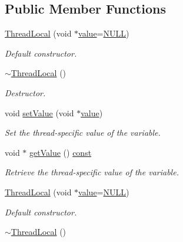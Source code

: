 \subsection*{Public Member Functions}
\begin{DoxyCompactItemize}
\item 
\hyperlink{classsf_1_1_thread_local_a44ea3c4be4eef118080275cbf4cf04cd}{Thread\-Local} (void $\ast$\hyperlink{curses_8priv_8h_a3772851912abe3ccbff5c659ff71f2ff}{value}=\hyperlink{internal_8h_a070d2ce7b6bb7e5c05602aa8c308d0c4}{N\-U\-L\-L})
\begin{DoxyCompactList}\small\item\em Default constructor. \end{DoxyCompactList}\item 
\hyperlink{classsf_1_1_thread_local_acc612bddfd0f0507b1c5da8b3b8c75c2}{$\sim$\-Thread\-Local} ()
\begin{DoxyCompactList}\small\item\em Destructor. \end{DoxyCompactList}\item 
void \hyperlink{classsf_1_1_thread_local_ab7e334c83d77644a8e67ee31c3230007}{set\-Value} (void $\ast$\hyperlink{curses_8priv_8h_a3772851912abe3ccbff5c659ff71f2ff}{value})
\begin{DoxyCompactList}\small\item\em Set the thread-\/specific value of the variable. \end{DoxyCompactList}\item 
void $\ast$ \hyperlink{classsf_1_1_thread_local_aef35a39686eac4b6634a6e5605aacfd7}{get\-Value} () \hyperlink{term__entry_8h_a57bd63ce7f9a353488880e3de6692d5a}{const} 
\begin{DoxyCompactList}\small\item\em Retrieve the thread-\/specific value of the variable. \end{DoxyCompactList}\item 
\hyperlink{classsf_1_1_thread_local_a44ea3c4be4eef118080275cbf4cf04cd}{Thread\-Local} (void $\ast$\hyperlink{curses_8priv_8h_a3772851912abe3ccbff5c659ff71f2ff}{value}=\hyperlink{internal_8h_a070d2ce7b6bb7e5c05602aa8c308d0c4}{N\-U\-L\-L})
\begin{DoxyCompactList}\small\item\em Default constructor. \end{DoxyCompactList}\item 
\hyperlink{classsf_1_1_thread_local_acc612bddfd0f0507b1c5da8b3b8c75c2}{$\sim$\-Thread\-Local} ()

\end{DoxyCompactItemize}
